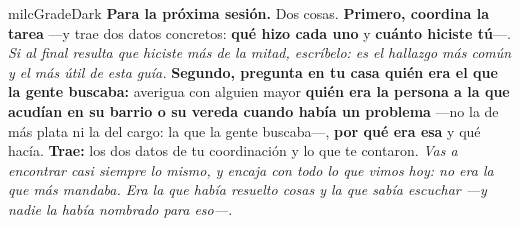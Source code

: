 \documentclass[11pt,letterpaper]{article}
\begin{document}
\begin{infoband}{milcGradeDark}
\textbf{Para la próxima sesión.} Dos cosas. \textbf{Primero, coordina la tarea} ---y trae dos datos concretos: \textbf{qué hizo cada uno} y \textbf{cuánto hiciste tú}---. \emph{Si al final resulta que hiciste más de la mitad, escríbelo: es el hallazgo más común y el más útil de esta guía.} \textbf{Segundo, pregunta en tu casa quién era el que la gente buscaba:} averigua con alguien mayor \textbf{quién era la persona a la que acudían en su barrio o su vereda cuando había un problema} ---no la de más plata ni la del cargo: la que la gente buscaba---, \textbf{por qué era esa} y qué hacía. \textbf{Trae:} los dos datos de tu coordinación y lo que te contaron. \emph{Vas a encontrar casi siempre lo mismo, y encaja con todo lo que vimos hoy: no era la que más mandaba. Era la que había resuelto cosas y la que sabía escuchar ---y nadie la había nombrado para eso---.}
\end{infoband}
\end{document}
